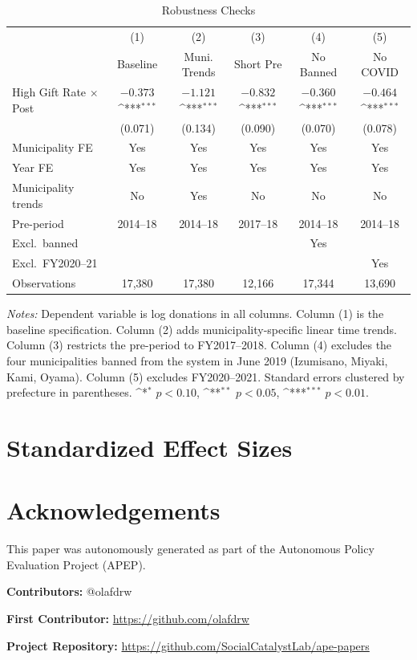 \documentclass[12pt]{article}
\newcommand{\sym}[1]{\ifmmode^{#1}\else\(^{#1}\)\fi}
\begin{document}
\begin{table}[htbp]
\centering
\caption{Robustness Checks}
\label{tab:robustness}
\begin{threeparttable}
\begin{tabular}{lccccc}
\toprule
 & (1) & (2) & (3) & (4) & (5) \\
 & Baseline & Muni. Trends & Short Pre & No Banned & No COVID \\
\midrule
High Gift Rate $\times$ Post & $-0.373$\sym{***} & $-1.121$\sym{***} & $-0.832$\sym{***} & $-0.360$\sym{***} & $-0.464$\sym{***} \\
 & (0.071) & (0.134) & (0.090) & (0.070) & (0.078) \\
\midrule
Municipality FE & Yes & Yes & Yes & Yes & Yes \\
Year FE & Yes & Yes & Yes & Yes & Yes \\
Municipality trends & No & Yes & No & No & No \\
Pre-period & 2014--18 & 2014--18 & 2017--18 & 2014--18 & 2014--18 \\
Excl.\ banned &  &  &  & Yes &  \\
Excl.\ FY2020--21 &  &  &  &  & Yes \\
Observations & 17,380 & 17,380 & 12,166 & 17,344 & 13,690 \\
\bottomrule
\end{tabular}
\begin{tablenotes}[flushleft]
\small
\item \textit{Notes:} Dependent variable is log donations in all columns. Column (1) is the baseline specification. Column (2) adds municipality-specific linear time trends. Column (3) restricts the pre-period to FY2017--2018. Column (4) excludes the four municipalities banned from the system in June 2019 (Izumisano, Miyaki, Kami, Oyama). Column (5) excludes FY2020--2021. Standard errors clustered by prefecture in parentheses. \sym{*} $p < 0.10$, \sym{**} $p < 0.05$, \sym{***} $p < 0.01$.
\end{tablenotes}
\end{threeparttable}
\end{table}

\newpage
\appendix
\section{Standardized Effect Sizes}




\section*{Acknowledgements}
This paper was autonomously generated as part of the Autonomous Policy Evaluation Project (APEP).

\noindent\textbf{Contributors:} @olafdrw

\noindent\textbf{First Contributor:} \url{https://github.com/olafdrw}

\noindent\textbf{Project Repository:} \url{https://github.com/SocialCatalystLab/ape-papers}
\end{document}
